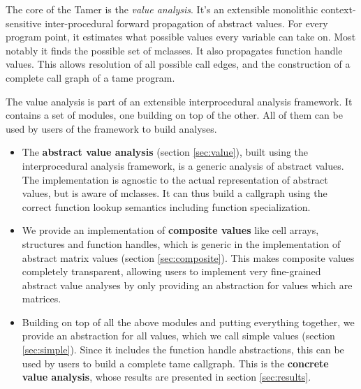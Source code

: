 The core of the \matlab Tamer is the {\em value analysis}. It's an
extensible monolithic context-sensitive inter-procedural forward
propagation of abstract \matlab values. For every program point, it estimates
what possible values every variable can take on. Most notably it finds
the possible set of mclasses. It also propagates function handle
values. This allows resolution of all possible call edges, and the
construction of a complete call graph of a tame \matlab program.

The value analysis is part of an extensible interprocedural analysis
framework. It contains a set of modules, one building on top of the
other. All of them can be used by users of the framework to build analyses.

\begin{itemize}

\item The \textbf{abstract value analysis} (section \ref{sec:value}), built
using the interprocedural analysis framework, is a generic analysis of abstract
\matlab values. The implementation is agnostic to the actual representation of
abstract values, but is aware of \matlab mclasses. It can thus build a
callgraph using the correct function lookup semantics including function
specialization.

\item We provide an implementation of \textbf{composite values} like cell
arrays, structures and function handles, which is generic in the
implementation of abstract matrix values
(section \ref{sec:composite}). This makes composite values completely
transparent, allowing users to implement very fine-grained abstract value
analyses by only providing an abstraction for \matlab values which are
matrices.

\item Building on top of all the above modules and putting everything
together, we provide an abstraction for all \matlab values, which we
call simple values (section \ref{sec:simple}). Since it includes the
function handle abstractions, this can be used by users to build a
complete tame \matlab callgraph. This is the \textbf{concrete value
analysis}, whose results are presented in section \ref{sec:results}.
\end{itemize}

